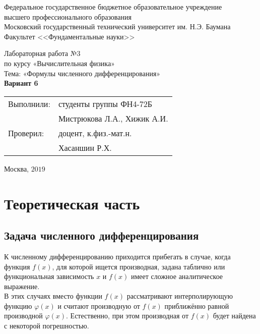 \documentclass[
11pt,
master, %
subf, %
href, %
colorlinks=true, %
times, %
]{disser}
\begin{document}
	
\pagestyle{empty}
\begin{center}
	
	\noindent  Федеральное государственное бюджетное образовательное учреждение\\
	высшего профессионального образования\\
	
	Московский государственный технический университет им. Н.Э. Баумана \\
	Факультет <<Фундаментальные науки>>\bigskip\\
	
	\vfill
	
	Лабораторная работа №3\\
	по курсу «Вычислительная физика»\\
	Тема: «Формулы численного дифференцирования»\\
	\textbf{Вариант 6}\\
	
	
	\vfill
	\vfill
	\begin{flushright}
		\begin{tabular}{ll}
			Выполнили: & студенты группы ФН4-72Б     \\
			& Мистрюкова Л.А., Хижик А.И.  \\
			Проверил:  & доцент, к.физ.-мат.н.       \\
			& Хасаншин Р.Х.
		\end{tabular}
	\end{flushright}
	\vfill
	\begin{center}
		Москва, $2019$
	\end{center}
	
\end{center}
\pagebreak


\pagestyle{plain}
\tableofcontents

\section{Теоретическая часть}
\subsection{Задача численного дифференцирования}
К численному дифференцированию приходится прибегать в случае, когда функция $f(x)$, для которой ищется производная, задана таблично или функциональная зависимость $x$ и $f(x)$ имеет сложное аналитическое выражение.\\
В этих случаях вместо функции $f(x)$ рассматривают интерполирующую функцию $\varphi(x)$ и считают производную от $f(x)$ приближённо равной производной $\varphi(x)$. Естественно, при этом производная от $f(x)$ будет найдена с некоторой погрешностью.
\end{document}
